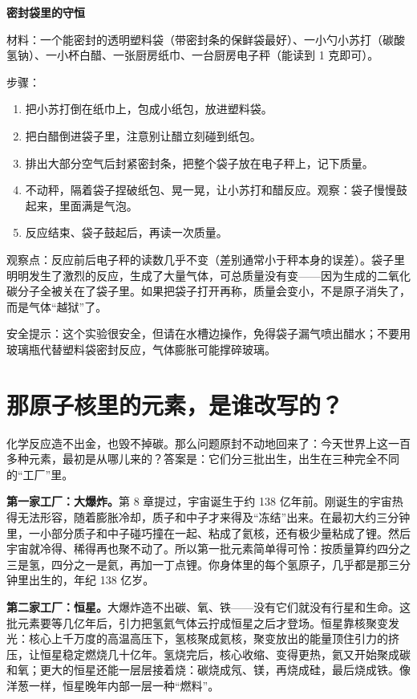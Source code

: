 \begin{shiyan}
\textbf{密封袋里的守恒}

材料：一个能密封的透明塑料袋（带密封条的保鲜袋最好）、一小勺小苏打（碳酸氢钠）、一小杯白醋、一张厨房纸巾、一台厨房电子秤（能读到 1 克即可）。

步骤：
\begin{enumerate}[itemsep=1pt]
\item 把小苏打倒在纸巾上，包成小纸包，放进塑料袋。
\item 把白醋倒进袋子里，注意别让醋立刻碰到纸包。
\item 排出大部分空气后封紧密封条，把整个袋子放在电子秤上，记下质量。
\item 不动秤，隔着袋子捏破纸包、晃一晃，让小苏打和醋反应。观察：袋子慢慢鼓起来，里面满是气泡。
\item 反应结束、袋子鼓起后，再读一次质量。
\end{enumerate}

观察点：反应前后电子秤的读数几乎不变（差别通常小于秤本身的误差）。袋子里明明发生了激烈的反应，生成了大量气体，可总质量没有变——因为生成的二氧化碳分子全被关在了袋子里。如果把袋子打开再称，质量会变小，不是原子消失了，而是气体“越狱”了。

安全提示：这个实验很安全，但请在水槽边操作，免得袋子漏气喷出醋水；不要用玻璃瓶代替塑料袋密封反应，气体膨胀可能撑碎玻璃。
\end{shiyan}

\section{那原子核里的元素，是谁改写的？}

化学反应造不出金，也毁不掉碳。那么问题原封不动地回来了：今天世界上这一百多种元素，最初是从哪儿来的？答案是：它们分三批出生，出生在三种完全不同的“工厂”里。

\textbf{第一家工厂：大爆炸。}第 8 章提过，宇宙诞生于约 138 亿年前。刚诞生的宇宙热得无法形容，随着膨胀冷却，质子和中子才来得及“冻结”出来。在最初大约三分钟里，一小部分质子和中子碰巧撞在一起、粘成了氦核，还有极少量粘成了锂。然后宇宙就冷得、稀得再也聚不动了。所以第一批元素简单得可怜：按质量算约四分之三是氢，四分之一是氦，再加一丁点锂。你身体里的每个氢原子，几乎都是那三分钟里出生的，年纪 138 亿岁。

\textbf{第二家工厂：恒星。}大爆炸造不出碳、氧、铁——没有它们就没有行星和生命。这批元素要等几亿年后，引力把氢氦气体云拧成恒星之后才登场。恒星靠核聚变发光：核心上千万度的高温高压下，氢核聚成氦核，聚变放出的能量顶住引力的挤压，让恒星稳定燃烧几十亿年。氢烧完后，核心收缩、变得更热，氦又开始聚成碳和氧；更大的恒星还能一层层接着烧：碳烧成氖、镁，再烧成硅，最后烧成铁。像洋葱一样，恒星晚年内部一层一种“燃料”。

